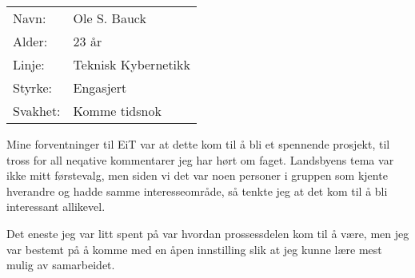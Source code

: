\begin{table}[H]
\begin{tabular}{l l}
        Navn: & Ole S. Bauck \\
        Alder: & 23 år \\ 
        Linje: & Teknisk Kybernetikk \\
        Styrke: & Engasjert\\
        Svakhet: & Komme tidsnok
    \end{tabular}
\end{table}

Mine forventninger til EiT var at dette kom til å bli et spennende prosjekt, til tross for all neqative kommentarer jeg har hørt om faget. 
Landsbyens tema var ikke mitt førstevalg, men siden vi det var noen personer i gruppen som kjente hverandre og hadde samme interesseområde, så tenkte jeg at det kom til å bli interessant allikevel.

Det eneste jeg var litt spent på var hvordan prossessdelen kom til å være, men jeg var bestemt på å komme med en åpen innstilling slik at jeg kunne lære mest mulig av samarbeidet.